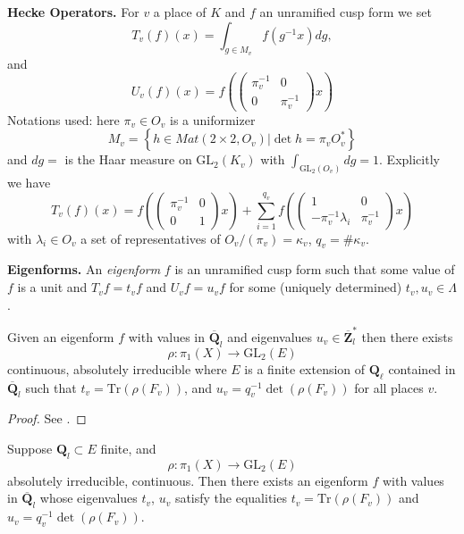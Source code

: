 \noindent
{\bf Hecke Operators.}
For $v$ a place of $K$ and $f$ an unramified cusp form we set
$$
T_v(f)(x) =
\int_{g\in M_v}f(g^{-1}x)dg,
$$
and
$$
U_v(f)(x) =
f\left(
\left(
\begin{matrix}
\pi_v^{-1} & 0 \\
0 & \pi_v^{-1}
\end{matrix}
\right)x\right)
$$
Notations used: here $\pi_v \in O_v$ is a uniformizer
$$
M_v =
\left\{
h\in Mat(2\times 2, O_v) | \det h = \pi_vO_v^*\right\}
$$
and $dg = $ is the Haar measure on $\text{GL}_2(K_v)$ with
$\int_{\text{GL}_2(O_v)} dg = 1$. Explicitly we have
$$
T_v(f)(x) =
f\left(
\left(
\begin{matrix}
\pi_v^{-1}& 0 \\
0 & 1
\end{matrix}
\right)
x\right) +
\sum_{i = 1}^{q_v}
f\left(\left(
\begin{matrix}
1 & 0 \\
-\pi_v^{-1}\lambda_i
& \pi_v^{-1}
\end{matrix}
\right) x\right)
$$
with $\lambda_i\in O_v$ a set of representatives of
$O_v/(\pi_v)=\kappa_v$, $q_v = \#\kappa_v$.

\medskip\noindent
{\bf Eigenforms.} An {\it eigenform} $f$ is an unramified cusp form
such that some value of $f$ is a unit and $T_vf = t_vf$ and
$U_vf = u_vf$ for some (uniquely determined) $t_v, u_v \in \Lambda$.

\begin{theorem}
\label{theorem-drinfeld-make-rho}
Given an eigenform $f$ with values in
$\overline{\mathbf{Q}}_l$ and eigenvalues
$u_v\in \overline{\mathbf{Z}}_l^*$ then there exists
$$
\rho : \pi_1(X)\to \text{GL}_2(E)
$$
continuous, absolutely irreducible where
$E$ is a finite extension of $\mathbf{Q}_\ell$ contained in
$\overline{\mathbf{Q}}_l$ such that
$t_v = \text{Tr}(\rho(F_v))$, and
$u_v = q_v^{-1}\det\left(\rho(F_v)\right)$ for all places $v$.
\end{theorem}

\begin{proof}
See \cite{D0}.
\end{proof}

\begin{theorem}
\label{theorem-drinfeld-make-f}
Suppose $\mathbf{Q}_l \subset E$ finite, and
$$
\rho : \pi_1(X)\to \text{GL}_2(E)
$$
absolutely irreducible, continuous. Then there exists an eigenform $f$ with
values in $\overline{\mathbf{Q}}_l$ whose eigenvalues $t_v$, $u_v$
satisfy the equalities
$t_v = \text{Tr}(\rho(F_v))$ and $u_v = q_v^{-1}\det(\rho(F_v))$.
\end{theorem}

